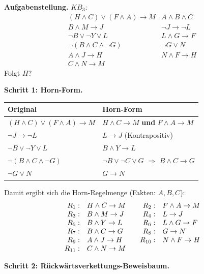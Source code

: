 \documentclass[a4paper,12pt]{article}
\begin{document}
\medskip
\textbf{Aufgabenstellung.} $KB_3$:
\[
\begin{array}{ll}
(H \wedge C) \vee (F \wedge A) \to M & A \wedge B \wedge C \\
B \wedge M \to J                     & \neg J \to \neg L \\
\neg B \vee \neg Y \vee L            & L \wedge G \to F \\
\neg(B \wedge C \wedge \neg G)       & \neg G \vee N \\
A \wedge J \to H                     & N \wedge F \to H \\
C \wedge N \to M
\end{array}
\]
Folgt $H$?

\bigskip
\textbf{Schritt 1: Horn-Form.}

\begin{center}
\renewcommand{\arraystretch}{1.25}
\begin{tabular}{ll}
\toprule
Original                                   & Horn-Form \\
\midrule
$(H \wedge C) \vee (F \wedge A) \to M$     & $H \wedge C \to M$ \;\textbf{und}\; $F \wedge A \to M$ \\
$\neg J \to \neg L$                        & $L \to J$ \;(Kontrapositiv) \\
$\neg B \vee \neg Y \vee L$                & $B \wedge Y \to L$ \\
$\neg(B \wedge C \wedge \neg G)$           & $\neg B \vee \neg C \vee G$ \;$\Rightarrow$\; $B \wedge C \to G$ \\
$\neg G \vee N$                            & $G \to N$ \\
\bottomrule
\end{tabular}
\end{center}

Damit ergibt sich die Horn-Regelmenge (Fakten: $A, B, C$):
\[
\begin{array}{rl@{\qquad}rl}
R_1: & H \wedge C \to M        & R_2: & F \wedge A \to M \\
R_3: & B \wedge M \to J        & R_4: & L \to J \\
R_5: & B \wedge Y \to L        & R_6: & L \wedge G \to F \\
R_7: & B \wedge C \to G        & R_8: & G \to N \\
R_9: & A \wedge J \to H        & R_{10}: & N \wedge F \to H \\
R_{11}: & C \wedge N \to M     & &
\end{array}
\]

\bigskip
\textbf{Schritt 2: R\"uckw\"artsverkettungs-Beweisbaum.}
\end{document}
